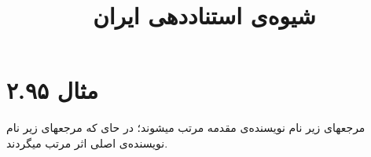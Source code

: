 \documentclass[a4paper,10pt]{article}
\begin{document}
\title{شیوه‌ی استناددهی ایران}
\author{}
\date{}
\maketitle



\section*{مثال ۲.۹۵}

مرجعهای \cite{معتمدنژاد1376,friedman1994} زیر نام نویسنده‌ی مقدمه مرتب میشوند؛ در حای که مرجعهای \cite{قندی1376,hayek1994} زیر نام نویسنده‌ی اصلی اثر مرتب میگردند.






\end{document}

